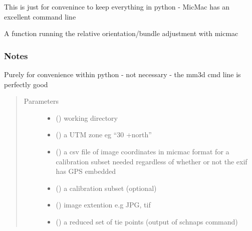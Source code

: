\documentclass[letterpaper,10pt,english]{sphinxmanual}
\begin{document}
This is just for convenince  to keep everything in python - MicMac has an
excellent command line


\begin{fulllineitems}
\label{\detokenize{pycmac:orientation.bundle_adjust}}
A function running the relative orientation/bundle adjustment with micmac
\subsubsection*{Notes}

Purely for convenience within python - not  necessary - the mm3d cmd line
is perfectly good
\begin{quote}\begin{description}
\item[{Parameters}] \leavevmode\begin{itemize}
\item {} 
 () \textendash{} working directory

\item {} 
 () \textendash{} a UTM zone eg “30 +north”

\item {} 
 () \textendash{} a csv file of image coordinates in micmac format for a calibration subset
needed regardless of whether or not the exif has GPS embedded

\item {} 
 () \textendash{} a calibration subset (optional)

\item {} 
 () \textendash{} image extention e.g JPG, tif

\item {} 
 () \textendash{} a reduced set of tie points (output of schnaps command)


\end{itemize}
\end{description}
\end{quote}
\end{fulllineitems}
\end{document}
